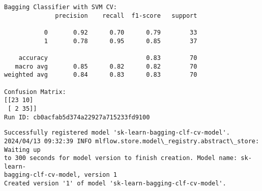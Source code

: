 \documentclass[11pt]{article}
\begin{document}
    \begin{Verbatim}[commandchars=\\\{\}]
Bagging Classifier with SVM CV:
              precision    recall  f1-score   support

           0       0.92      0.70      0.79        33
           1       0.78      0.95      0.85        37

    accuracy                           0.83        70
   macro avg       0.85      0.82      0.82        70
weighted avg       0.84      0.83      0.83        70

Confusion Matrix:
[[23 10]
 [ 2 35]]
Run ID: cb0acfab5d374a22927a715233fd9100
    \end{Verbatim}

    \begin{Verbatim}[commandchars=\\\{\}]
Successfully registered model 'sk-learn-bagging-clf-cv-model'.
2024/04/13 09:32:39 INFO mlflow.store.model\_registry.abstract\_store: Waiting up
to 300 seconds for model version to finish creation. Model name: sk-learn-
bagging-clf-cv-model, version 1
Created version '1' of model 'sk-learn-bagging-clf-cv-model'.
    \end{Verbatim}
\end{document}
